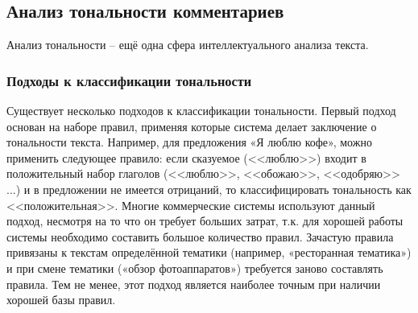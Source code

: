 
\subsection{Анализ тональности комментариев}
Анализ тональности -- ещё одна сфера интеллектуального анализа текста.

\subsubsection{Подходы к классификации тональности}
Существует несколько подходов к классификации тональности. Первый подход основан на наборе правил, применяя которые система делает заключение о тональности текста. Например, для предложения «Я люблю кофе», можно применить следующее правило: если сказуемое (<<люблю>>) входит в положительный набор глаголов (<<люблю>>, <<обожаю>>, <<одобряю>> ...) и в предложении не имеется отрицаний, то классифицировать тональность как <<положительная>>. Многие коммерческие системы используют данный подход, несмотря на то что он требует больших затрат, т.к. для хорошей работы системы необходимо составить большое количество правил. Зачастую правила привязаны к текстам определённой тематики (например, «ресторанная тематика») и при смене тематики («обзор фотоаппаратов») требуется заново составлять правила. Тем не менее, этот подход является наиболее точным при наличии хорошей базы правил.

